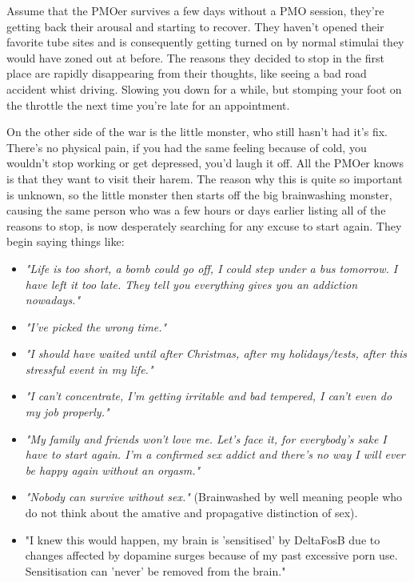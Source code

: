 \documentclass[easypeasy.tex]{subfiles}
\begin{document}
Assume that the PMOer survives a few days without a PMO session, they're getting back their arousal and starting to recover. They haven't opened their favorite tube sites and is consequently getting turned on by normal stimulai they would have zoned out at before. The reasons they decided to stop in the first place are rapidly disappearing from their thoughts, like seeing a bad road accident whist driving. Slowing you down for a while, but stomping your foot on the throttle the next time you're late for an appointment.

On the other side of the war is the little monster, who still hasn't had it's fix. There's no physical pain, if you had the same feeling because of cold, you wouldn't stop working or get depressed, you'd laugh it off. All the PMOer knows is that they want to visit their harem. The reason why this is quite so important is unknown, so the little monster then starts off the big brainwashing monster, causing the same person who was a few hours or days earlier listing all of the reasons to stop, is now desperately searching for any excuse to start again. They begin saying things like:
\begin{itemize}

  \item \textit{"Life is too short, a bomb could go off, I could step under a bus tomorrow. I have left it too late. They tell you everything gives you an addiction nowadays."}

  \item \textit{"I've picked the wrong time."}

  \item \textit{"I should have waited until after Christmas, after my holidays/tests, after this stressful event in my life."}

  \item \textit{"I can't concentrate, I'm getting irritable and bad tempered, I can't even do my job properly."}

  \item \textit{"My family and friends won't love me. Let's face it, for everybody's sake I have to start again. I'm a confirmed sex addict and there's no way I will ever be happy again without an orgasm."}

  \item \textit{"Nobody can survive without sex."} (Brainwashed by well meaning people who do not think about the amative and propagative distinction of sex).

\item "I knew this would happen, my brain is 'sensitised' by DeltaFosB due to changes affected by dopamine surges because of my past excessive porn use. Sensitisation can 'never' be removed from the brain."
\end{itemize}
\end{document}
